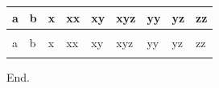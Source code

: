 \documentclass[landscape]{article}
\author{}
\date{\vspace{-2.5em}}
\begin{document}

\begingroup\fontsize{6}{8}\selectfont

\begin{longtable}{>{\raggedleft\arraybackslash}p{1.6cm}|>{\raggedleft\arraybackslash}p{1.6cm}|>{\raggedleft\arraybackslash}p{1.7cm}|>{\raggedleft\arraybackslash}p{1cm}|>{\raggedleft\arraybackslash}p{2.5cm}|>{\raggedleft\arraybackslash}p{2.5cm}|>{\raggedleft\arraybackslash}p{2.5cm}|>{\raggedleft\arraybackslash}p{2.5cm}|>{\raggedleft\arraybackslash}p{2.5cm}}
\hline
a & b & x & xx & xy & xyz & yy & yz & zz\\
\hline
\endfirsthead
\multicolumn{9}{@{}l}{\textit{(continued)}}\\
\hline
a & b & x & xx & xy & xyz & yy & yz & zz\\
\hline
\endhead
\cellcolor{gray!6}{1} & \cellcolor{gray!6}{2} & \cellcolor{gray!6}{4} & \cellcolor{gray!6}{5} & \cellcolor{gray!6}{6} & \cellcolor{gray!6}{8} & \cellcolor{gray!6}{9} & \cellcolor{gray!6}{11} & \cellcolor{gray!6}{12}\\
\hline
\end{longtable}
\endgroup{}

End.
\end{document}
